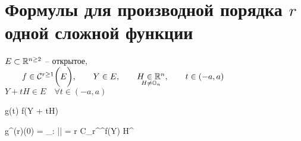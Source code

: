 \section{Формулы для производной порядка \texorpdfstring{$ r $}r одной сложной функции}

\begin{theorem}
	$ E \sub \R^{n \ge 2} $ -- открытое, $ \qquad f \in \Cont[r \ge 1]{E}, \qquad Y \in E, \qquad \underset{H \ne \On}{H \in \R^n}, \qquad t \in (-a, a) $ \\
	$ Y + tH \in E \quad \forall t \in (-a, a) $
	\begin{equ}{10}
		g(t)  f(Y + tH)
	\end{equ}
	\begin{equ}{11}
		\implies g^{(r)}(0) = \sum_{\alpha : |\alpha| = r} C_r^\alpha \partial^\alpha f(Y) H^\alpha
	\end{equ}
\end{theorem}

